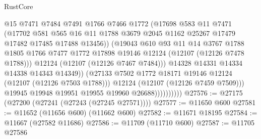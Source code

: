 \begin{lexlean}{RustCore}
\begin{coremodule}
                                @15
                                @7471
                                @7484
                                @7491
                                @1766
                                @7466
                                @1772
                                (@17698
                                  @583
                                  @11
                                  @7471
                                  (@17702
                                    @581
                                    @565
                                    @16
                                    @11
                                    @1788
                                    @3679
                                    @2045
                                    @1162
                                    @25267
                                    @17479
                                    @17482
                                    @17485
                                    @17488
                                    @13456))
                                (@19043
                                  @610
                                  @93
                                  @11
                                  @14
                                  @3767
                                  @1788
                                  @1805
                                  @1766
                                  @7477
                                  @1772
                                  @17898
                                  @19146
                                  @12124
                                  (@12107 (@12126 @7478 @1788)))
                                @12124
                                (@12107 (@12126 @7467 @7484)))
                              @14328
                              @14331
                              @14334
                              @14338
                              @14343
                              @14349))
                          (@27133 @7502 @1772 @18171 @19146 @12124 (@12107 (@12126 @7503 @1788)))
                          @12124
                          (@12107 (@12126 @7459 @7509)))
                        @19945
                        @19948
                        @19951
                        @19955
                        @19960
                        @26688))))))))))
@27576 := @27175 (@27200 (@27241 (@27243 (@27245 @27571))))
@27577 := @11650 @600
@27581 := @11652 (@11656 @600) (@11662 @600)
@27582 := @11671 @18195
@27584 := @11667 (@27582 @11686)
@27586 := @11709 (@11710 @600)
@27587 := @11705 @27586

\end{coremodule}
\end{lexlean}
